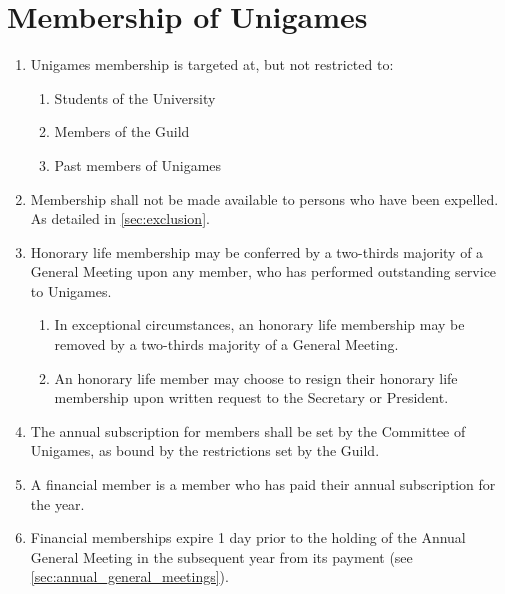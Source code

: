 \documentclass[a4paper]{article}
\begin{document}
\section{Membership of Unigames} \label{sec:membership}
\begin{enumerate}
    \item Unigames membership is targeted at, but not restricted to:
          \begin{enumerate}
              \item Students of the University
              \item Members of the Guild
              \item Past members of Unigames
          \end{enumerate}
    \item Membership shall not be made available to persons who have been expelled. As detailed in \cref{sec:exclusion}.
    \item Honorary life membership may be conferred by a two-thirds majority of a General Meeting upon any member, who has performed outstanding service to Unigames.
          \begin{enumerate}
              \item In exceptional circumstances, an honorary life membership may be removed by a two-thirds majority of a General Meeting.
              \item An honorary life member may choose to resign their honorary life membership upon written request to the Secretary or President.
          \end{enumerate}
    \item The annual subscription for members shall be set by the Committee of Unigames, as bound by the restrictions set by the Guild.
    \item A financial member is a member who has paid their annual subscription for the year.
    \item Financial memberships expire 1 day prior to the holding of the Annual General Meeting in the subsequent year from its payment (see \cref{sec:annual_general_meetings}).
\end{enumerate}
\end{document}
